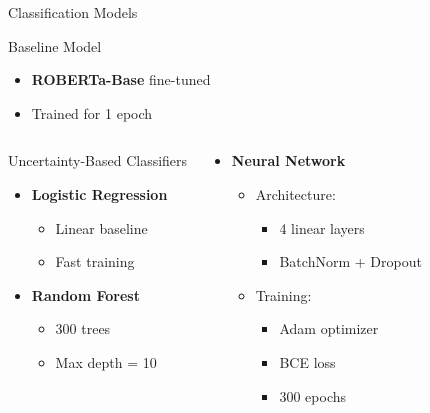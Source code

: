 \documentclass{beamer}
\begin{document}
\begin{frame}{Classification Models}
\begin{block}{Baseline Model}
\begin{itemize}
\item \textbf{ROBERTa-Base} fine-tuned
\item Trained for 1 epoch
\end{itemize}
\end{block}

\begin{columns}[T]
\begin{block}{Uncertainty-Based Classifiers}
\begin{itemize}
\item \textbf{Logistic Regression}
  \begin{itemize}
  \item Linear baseline
  \item Fast training
  \end{itemize}
  
\item \textbf{Random Forest}
  \begin{itemize}
  \item 300 trees
  \item Max depth = 10
  \end{itemize}
\end{itemize}
\end{block}

\begin{block}{}
\begin{itemize}
\item \textbf{Neural Network}
  \begin{itemize}
  \item Architecture:
    \begin{itemize}
    \item 4 linear layers
    \item BatchNorm + Dropout
    \end{itemize}
  \item Training:
    \begin{itemize}
    \item Adam optimizer
    \item BCE loss
    \item 300 epochs
    \end{itemize}
  \end{itemize}
\end{itemize}
\end{block}
\end{columns}

\end{frame}
\end{document}
